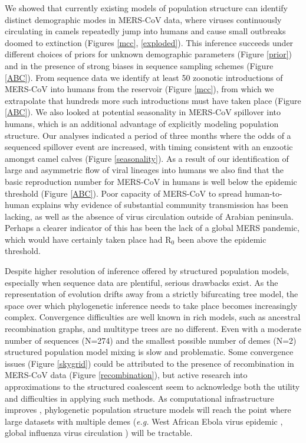 \documentclass[11pt,oneside,letterpaper]{article}
\begin{document}
We showed that currently existing models of population structure \citep{vaughan_efficient_2014} can identify distinct demographic modes in MERS-CoV data, where viruses continuously circulating in camels repeatedly jump into humans and cause small outbreaks doomed to extinction (Figures \ref{mcc}, \ref{exploded}).
This inference succeeds under different choices of priors for unknown demographic parameters (Figure \ref{prior}) and in the presence of strong biases in sequence sampling schemes (Figure \ref{ABC}).
From sequence data we identify at least 50 zoonotic introductions of MERS-CoV into humans from the reservoir (Figure \ref{mcc}), from which we extrapolate that hundreds more such introductions must have taken place (Figure \ref{ABC}).
We also looked at potential seasonality in MERS-CoV spillover into humans, which is an additional advantage of explicitly modeling population structure.
Our analyses indicated a period of three months where the odds of a sequenced spillover event are increased, with timing consistent with an enzootic amongst camel calves (Figure \ref{seasonality}).
As a result of our identification of large and asymmetric flow of viral lineages into humans we also find that the basic reproduction number for MERS-CoV in humans is well below the epidemic threshold (Figure \ref{ABC}).
Poor capacity of MERS-CoV to spread human-to-human explains why evidence of substantial community transmission has been lacking, as well as the absence of virus circulation outside of Arabian peninsula.
Perhaps a clearer indicator of this has been the lack of a global MERS pandemic, which would have certainly taken place had R$_{0}$ been above the epidemic threshold.

Despite higher resolution of inference offered by structured population models, especially when sequence data are plentiful, serious drawbacks exist.
As the representation of evolution drifts away from a strictly bifurcating tree model, the space over which phylogenetic inference needs to take place becomes increasingly complex.
Convergence difficulties are well known in rich models, such as ancestral recombination graphs, and multitype trees are no different.
Even with a moderate number of sequences (N=274) and the smallest possible number of demes (N=2) structured population model mixing is slow and problematic.
Some convergence issues (Figure \ref{skygrid}) could be attributed to the presence of recombination in MERS-CoV data (Figure \ref{recombination}), but active research into approximations to the structured coalescent \citep{maio_new_2015} seem to acknowledge both the utility and difficulties in applying such methods. %
As computational infrastructure improves \citep{ayres_beagle:_2012}, %
phylogenetic population structure models will reach the point where large datasets with multiple demes (\textit{e.g.} West African Ebola virus epidemic \citep{dudas_virus_2017}, global influenza virus circulation \citep{bedford_global_2015}) will be tractable.
\end{document}
